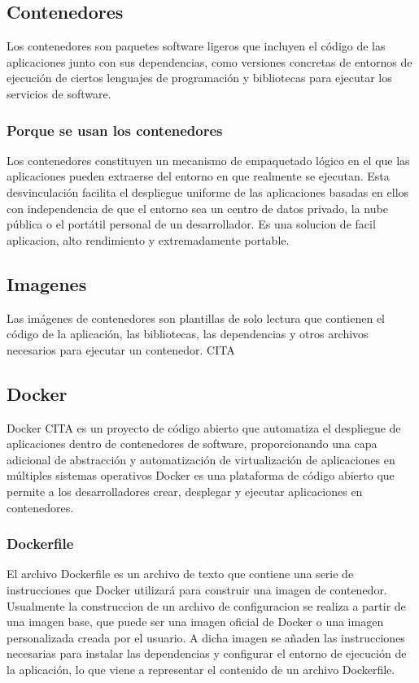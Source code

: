 \documentclass[12pt, a4paper, twoside]{article}
\begin{document}
\subsection{Contenedores}
Los contenedores son paquetes software ligeros que incluyen el código de las aplicaciones junto con sus dependencias, como versiones concretas de entornos de ejecución de ciertos lenguajes de programación y bibliotecas para ejecutar los servicios de software.
\subsubsection{Porque se usan los contenedores}
Los contenedores constituyen un mecanismo de empaquetado lógico en el que las aplicaciones pueden extraerse del entorno en que realmente se ejecutan. 
Esta desvinculación facilita el despliegue uniforme de las aplicaciones basadas en ellos con independencia de que el entorno sea un centro de datos privado, la nube pública o el portátil personal de un desarrollador.
Es una solucion de facil aplicacion, alto rendimiento y extremadamente portable.
\subsection{Imagenes}
Las imágenes de contenedores son plantillas de solo lectura que contienen el código de la aplicación, las bibliotecas, las dependencias y otros archivos necesarios para ejecutar un contenedor. CITA 
\subsection{Docker}
Docker CITA es un proyecto de código abierto que automatiza el despliegue de aplicaciones dentro de contenedores de software, proporcionando una capa adicional de abstracción y automatización de virtualización de aplicaciones en múltiples sistemas operativos
Docker es una plataforma de código abierto que permite a los desarrolladores crear, desplegar y ejecutar aplicaciones en contenedores. 
\subsubsection{Dockerfile}
El archivo Dockerfile es un archivo de texto que contiene una serie de instrucciones que Docker utilizará para construir una imagen de contenedor.
Usualmente la construccion de un archivo de configuracion se realiza a partir de una imagen base, que puede ser una imagen oficial de Docker o una imagen personalizada creada por el usuario.
A dicha imagen se añaden las instrucciones necesarias para instalar las dependencias y configurar el entorno de ejecución de la aplicación, lo que viene a representar el contenido de un archivo Dockerfile.
\end{document}
